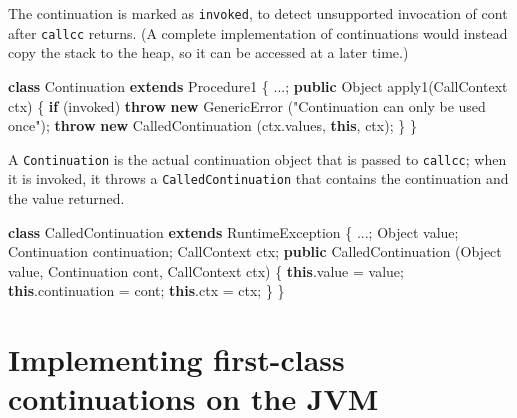 \documentclass[12pt,a4paper,oneside,openright]{book}
\newenvironment{Shaded}{\begin{snugshade}}{\end{snugshade}}
\newcommand{\KeywordTok}[1]{\textcolor[rgb]{0.13,0.29,0.53}{\textbf{{#1}}}}
\newcommand{\StringTok}[1]{\textcolor[rgb]{0.31,0.60,0.02}{{#1}}}
\newcommand{\FunctionTok}[1]{\textcolor[rgb]{0.00,0.00,0.00}{{#1}}}
\newcommand{\NormalTok}[1]{{#1}}
\begin{document}
The continuation is marked as \texttt{invoked}, to detect unsupported
invocation of cont after \texttt{callcc} returns. (A complete
implementation of continuations would instead copy the stack to the
heap, so it can be accessed at a later time.)

\begin{Shaded}
\begin{Highlighting}[]
    \KeywordTok{class} \NormalTok{Continuation }\KeywordTok{extends} \NormalTok{Procedure1 \{}
        \NormalTok{...;}
        \KeywordTok{public} \NormalTok{Object }\FunctionTok{apply1}\NormalTok{(CallContext ctx) \{}
            \KeywordTok{if} \NormalTok{(invoked)}
                \KeywordTok{throw} \KeywordTok{new} \NormalTok{GenericError}
                    \NormalTok{(}\StringTok{"Continuation can only be used once"}\NormalTok{);}
            \KeywordTok{throw} \KeywordTok{new} \FunctionTok{CalledContinuation} \NormalTok{(ctx.}\FunctionTok{values}\NormalTok{, }\KeywordTok{this}\NormalTok{, ctx);}
        \NormalTok{\}}
    \NormalTok{\}}
\end{Highlighting}
\end{Shaded}

A \texttt{Continuation} is the actual continuation object that is passed
to \texttt{callcc}; when it is invoked, it throws a
\texttt{CalledContinuation} that contains the continuation and the value
returned.

\begin{Shaded}
\begin{Highlighting}[]
    \KeywordTok{class} \NormalTok{CalledContinuation}
        \KeywordTok{extends} \NormalTok{RuntimeException \{}
        \NormalTok{...;}
        \NormalTok{Object value;}
        \NormalTok{Continuation continuation;}
        \NormalTok{CallContext ctx;}
        \KeywordTok{public} \NormalTok{CalledContinuation}
            \NormalTok{(Object value, Continuation cont, CallContext ctx) \{}
            \KeywordTok{this}\NormalTok{.}\FunctionTok{value} \NormalTok{= value;}
            \KeywordTok{this}\NormalTok{.}\FunctionTok{continuation} \NormalTok{= cont;}
            \KeywordTok{this}\NormalTok{.}\FunctionTok{ctx} \NormalTok{= ctx;}
        \NormalTok{\}}
    \NormalTok{\}}
\end{Highlighting}
\end{Shaded}

\chapter{Implementing first-class continuations on the
JVM}\label{implementing-first-class-continuations-on-the-jvm}
\end{document}
